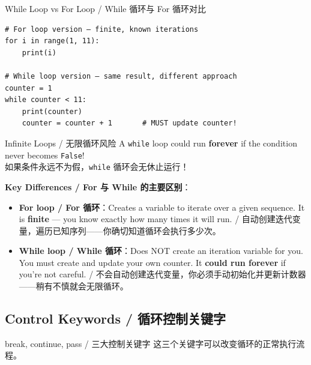 \documentclass[11pt,a4paper]{report}
\let\oldtexttt\texttt
\renewcommand{\texttt}[1]{\textcolor{mainblue}{\oldtexttt{#1}}}
\begin{document}
\begin{examplebox}{While Loop vs For Loop / While 循环与 For 循环对比}
\begin{lstlisting}
# For loop version — finite, known iterations
for i in range(1, 11):
    print(i)

# While loop version — same result, different approach
counter = 1
while counter < 11:
    print(counter)
    counter = counter + 1       # MUST update counter!
\end{lstlisting}
\end{examplebox}

\begin{warning}{Infinite Loops / 无限循环风险}
    A \texttt{while} loop could run \textbf{forever} if the condition never becomes \texttt{False}! \\
    如果条件永远不为假，\texttt{while} 循环会无休止运行！

    \textbf{Key Differences / For 与 While 的主要区别}：
    \begin{itemize}[itemsep=0.3em]
        \item \textbf{For loop / For 循环}：Creates a variable to iterate over a given sequence. It is \textbf{finite} — you know exactly how many times it will run. / 自动创建迭代变量，遍历已知序列——你确切知道循环会执行多少次。
        \item \textbf{While loop / While 循环}：Does NOT create an iteration variable for you. You must create and update your own counter. It \textbf{could run forever} if you're not careful. / 不会自动创建迭代变量，你必须手动初始化并更新计数器——稍有不慎就会无限循环。
    \end{itemize}
\end{warning}

\subsection{Control Keywords / 循环控制关键字}

\begin{concept}{break, continue, pass / 三大控制关键字}
    这三个关键字可以改变循环的正常执行流程。
\end{concept}
\end{document}
